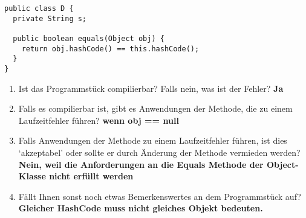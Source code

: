 \begin{lstlisting}
public class D {
  private String s;

  public boolean equals(Object obj) {
    return obj.hashCode() == this.hashCode();
  }
}
\end{lstlisting}
\begin{enumerate}
    \item Ist das Programmstück compilierbar? Falls nein, was ist der Fehler? \newline
          \textbf{Ja}
    \item Falls es compilierbar ist, gibt es Anwendungen der Methode, die zu einem
          Laufzeitfehler führen? \newline\textbf{wenn obj == null}
    \item Falls Anwendungen der Methode zu einem Laufzeitfehler führen, ist dies
          `akzeptabel' oder sollte er durch Änderung der Methode vermieden
          werden?\newline \textbf{Nein, weil die Anforderungen an die Equals 
          Methode der Object-Klasse nicht erfüllt werden}
    \item Fällt Ihnen sonst noch etwas Bemerkenswertes an dem Programmstück auf?\newline
          \textbf{Gleicher HashCode muss nicht gleiches Objekt bedeuten.}
\end{enumerate}